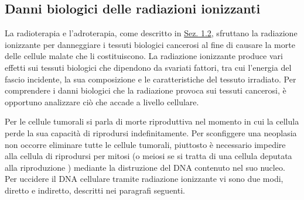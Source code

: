 \documentclass[12pt,a4paper,twoside]{report}
\begin{document}
	\subsection{Danni biologici delle radiazioni ionizzanti}
	La radioterapia e l'adroterapia, come descritto in \hyperref[sec:1.2]{Sez. 1.2}, sfruttano la radiazione ionizzante per danneggiare i tessuti biologici cancerosi al fine di causare la morte delle cellule malate che li costituiscono. La radiazione ionizzante produce vari effetti sui tessuti biologici che dipendono da svariati fattori, tra cui l'energia del fascio incidente, la sua composizione e le caratteristiche del tessuto irradiato. Per comprendere i danni biologici che la radiazione provoca sui tessuti cancerosi, è opportuno analizzare ciò che accade a livello cellulare.
	
	Per le cellule tumorali si parla di morte riproduttiva nel momento in cui la cellula perde la sua capacità di riprodursi indefinitamente. Per sconfiggere una neoplasia non occorre eliminare tutte le cellule tumorali, piuttosto è necessario impedire alla cellula di riprodursi per mitosi (o meiosi se si tratta di una cellula deputata alla riproduzione \cite{campbell2anno}) mediante la distruzione del DNA contenuto nel suo nucleo. Per uccidere il DNA cellulare tramite radiazione ionizzante vi sono due modi, diretto e indiretto, descritti nei paragrafi seguenti.
	
\end{document}
